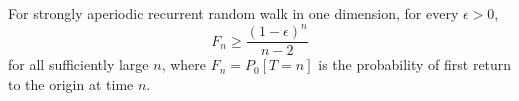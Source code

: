 For strongly aperiodic recurrent random walk in one dimension, for every $\epsilon > 0$,
$$F_n \geq \frac{(1-\epsilon)^n}{n-2}$$
for all sufficiently large $n$, where $F_n = P_0[T = n]$ is the probability of first return to the origin at time $n$.
